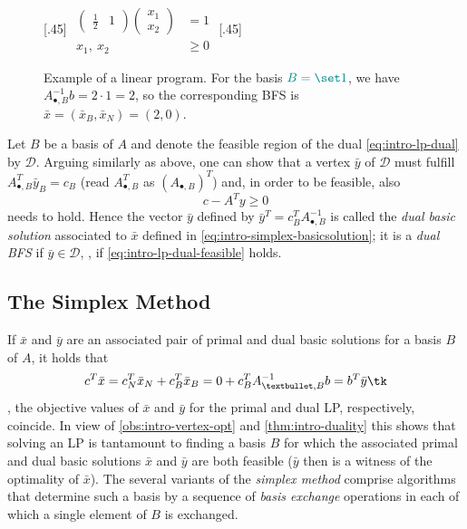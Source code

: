 \begin{figure}
  \centering
  [.45\textwidth]{
    $\begin{aligned}
      \begin{pmatrix}\frac12&1\end{pmatrix} \begin{pmatrix}x_1\\x_2\end{pmatrix} &= 1\\
      x_1,\ x_2 &≥ 0
    \end{aligned}$
  }
  \quad
  [.45\textwidth]{
  }
  \caption{Example of a linear program. For the basis $\textcolor{DarkCyan}{B=\set 1}$, we have $A_{•,B}^{-1} b = 2 · 1 = 2$, so the corresponding BFS is $\bar x = (\bar x_B, \bar x_N) = (2,0)$.}
  \label{fig:example-lp}
\end{figure}

Let $B$ be a basis of $A$ and denote the feasible region of the dual \cref{eq:intro-lp-dual} by $\mathcal D$. Arguing similarly as above, one can show that a vertex $\bar y$ of $\mathcal D$ must fulfill $A^T_{•,B}\bar y_B=c_B$ (read $A^T_{•,B}$ as $(A_{•,B})^T$) and, in order to be feasible, also
\begin{equation}\label{eq:intro-lp-dual-feasible}
  c-A^T y ≥ 0
\end{equation}
needs to hold. Hence the vector $\bar y$ defined by $\bar y^T = c_B^T A_{•,B}^{-1}$ is called the \emph{dual basic solution} associated to $\bar x$ defined in \cref{eq:intro-simplex-basicsolution}; it is a \emph{dual BFS} if $\bar y ∈ \mathcal D$, \ie, if \cref{eq:intro-lp-dual-feasible} holds.

\subsection{The Simplex Method}
If $\bar x$ and $\bar y$ are an associated pair of primal and dual basic solutions for a basis $B$ of $A$, it holds that
\[ c^T \bar x = c_N^T \bar x_N + c_B^T \bar x_B = 0 + c_B^T A_{•,B}^{-1} b = b^T\bar y \tk\]
\ie, the objective values of $\bar x$ and $\bar y$ for the primal and dual LP, respectively, coincide. In view of \cref{obs:intro-vertex-opt} and \cref{thm:intro-duality} this shows that solving an LP is tantamount to finding a basis $B$ for which the associated primal and dual basic solutions $\bar x$ and $\bar y$ are both feasible ($\bar y$ then is a witness of the optimality of $\bar x$). The several variants of the \emph{simplex method} comprise algorithms that determine such a basis by a sequence of \emph{basis exchange} operations in each of which a single element of $B$ is exchanged.

